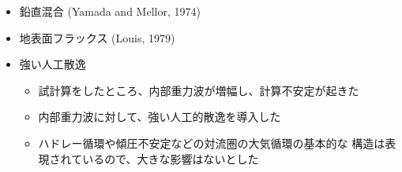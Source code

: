 \documentclass[aspectratio=149,9pt,fleqn]{beamer}
\begin{document}
\begin{frame}
\begin{columns}[onlytextwidth,T]
\begin{column}{.45\textwidth}
\begin{itemize}
				\item 鉛直混合 (Yamada and Mellor, 1974)
				\item 地表面フラックス (Louis, 1979)
				\item 強い人工散逸
					\begin{itemize}
						\item 試計算をしたところ、内部重力波が増幅し、計算不安定が起きた
						\item 内部重力波に対して、強い人工的散逸を導入した
						\item ハドレー循環や傾圧不安定などの対流圏の大気循環の基本的な
							構造は表現されているので、大きな影響はないとした
					\end{itemize}
			\end{itemize}
		\end{column}
	\end{columns}
\end{frame}
\end{document}
